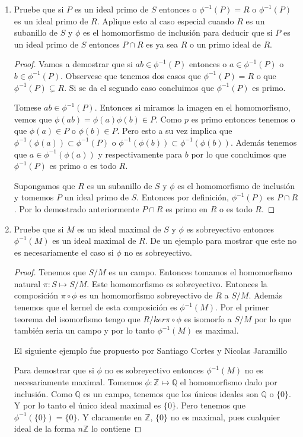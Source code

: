 \documentclass[letter,twoside,12pt]{article}
\begin{document}
\begin{enumerate}[label=\textbf{(\alph*)}]
\item Pruebe que si $P$ es un ideal primo de $S$ entonces o $\phi^{-1}(P)=R$ o $\phi^{-1}(P)$ es un ideal primo de $R$. Aplique esto al caso especial cuando $R$ es un subanillo de $S$ y  $\phi$ es el homomorfismo de inclusi\'on para deducir que si $P$ es un ideal primo de $S$ entonces $P \cap R$ es ya sea $R$ o un primo ideal de $R$.
\begin{proof}
Vamos a demostrar que si $ab \in \phi^{-1}(P)$ entonces o $a \in \phi^{-1}(P)$ o $b \in \phi^{-1}(P)$. Observese que tenemos dos casos que $\phi^{-1}(P)=R$ o que $\phi^{-1}(P)\subsetneq R$. Si se da el segundo caso concluimos que $\phi^{-1}(P)$ es primo.  

 Tomese $ab \in \phi^{-1}(P)$. Entonces si miramos la imagen en el homomorfismo, vemos que $\phi(ab)=\phi(a)\phi(b) \in P$. Como $p$ es primo entonces tenemos o que $\phi(a)\in P$ o $\phi(b)\in P$. Pero esto a su vez implica que $\phi^{-1}(\phi(a)) \subset \phi^{-1}(P)$ o $\phi^{-1}(\phi(b)) \subset \phi^{-1}(\phi(b))$. Adem\'as tenemos que $a \in \phi^{-1}(\phi(a))$ y respectivamente para $b$ por lo que concluimos que $\phi^{-1}(P)$ es primo o es todo $R$.
 
 Supongamos que $R$ es un subanillo de $S$ y $\phi$ es el homomorfismo de inclusión y tomemos $P$ un ideal primo de $S$. Entonces por definición, $\phi^{-1}(P)$ es $P \cap R$. Por lo demostrado anteriormente $P \cap R$ es primo en $R$ o es todo $R$.
 \end{proof}
\item Pruebe que si $M$ es un ideal maximal de $S$ y $\phi$ es sobreyectivo entonces $\phi^{-1}(M)$ es un ideal maximal de $R$. De un ejemplo para mostrar que este no es necesariamente el caso si $\phi$ no es sobreyectivo.
\begin{proof}
Tenemos que $S/M$ es un campo. Entonces tomamos el homomorfismo natural $\pi:S \mapsto S/M$. Este homomorfismo es sobreyectivo. Entonces la composici\'on $\pi \circ \phi $ es un homomorfismo sobreyectivo de $R$ a $S/M$. Adem\'as tenemos que el kernel de esta composici\'on es $\phi^{-1}(M)$. Por el primer teorema del isomorfismo tengo que $R/ker \pi \circ \phi$ es isomorfo a $S/M$ por lo que tambi\'en seria un campo y por lo tanto $\phi^{-1}(M)$ es maximal. 

El siguiente ejemplo fue propuesto por Santiago Cortes y Nicolas Jaramillo
 
 Para demostrar que si $\phi$ no es sobreyectivo entonces $\phi^{-1}(M)$ no es necesariamente maximal. Tomemos $\phi:\mathbb{Z} \mapsto \mathbb{Q}$ el homomorfismo dado por inclusi\'on. Como $\mathbb{Q}$ es un campo, tenemos que los \'unicos ideales son $\mathbb{Q}$ o $\{0\}$. Y por lo tanto el \'unico ideal maximal es $\{0\}$. Pero tenemos que $\phi^{-1}(\{0\})=\{0\}$. Y claramente en $\mathbb{Z}$, $\{0\}$ no es maximal, pues cualquier ideal de la forma $n\mathbb{Z}$ lo contiene    
\end{proof}
\end{enumerate}
\end{document}
